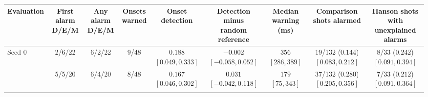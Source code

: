 \begin{table}[t]
\centering
\small
\setlength{\tabcolsep}{2pt}
\begin{tabular}{@{}lcccccccc@{}}
\toprule
Evaluation & \shortstack{First alarm\\D/E/M} & \shortstack{Any alarm\\D/E/M} & \shortstack{Onsets\\warned} & \shortstack{Onset\\detection} & \shortstack{Detection minus\\random\\reference} & \shortstack{Median warning\\(ms)} & \shortstack{Comparison\\shots alarmed} & \shortstack{Hanson shots\\with unexplained\\alarms} \\
\midrule
\shortstack[l]{Seed 0\\\phantom{{\scriptsize $[\,]$}}} & \shortstack{2/6/22\\\phantom{{\scriptsize $[\,]$}}} & \shortstack{6/2/22\\\phantom{{\scriptsize $[\,]$}}} & \shortstack{9/48\\\phantom{{\scriptsize $[\,]$}}} & \shortstack{$0.188$\\{\scriptsize $[0.049, 0.333]$}} & \shortstack{$-0.002$\\{\scriptsize $[-0.058, 0.052]$}} & \shortstack{$356$\\{\scriptsize $[286, 389]$}} & \shortstack{19/132 ($0.144$)\\{\scriptsize $[0.083, 0.212]$}} & \shortstack{8/33 ($0.242$)\\{\scriptsize $[0.091, 0.394]$}} \\ \addlinespace[4pt]
\shortstack[l]{Seed 1\\\phantom{{\scriptsize $[\,]$}}} & \shortstack{5/5/20\\\phantom{{\scriptsize $[\,]$}}} & \shortstack{6/4/20\\\phantom{{\scriptsize $[\,]$}}} & \shortstack{8/48\\\phantom{{\scriptsize $[\,]$}}} & \shortstack{$0.167$\\{\scriptsize $[0.046, 0.302]$}} & \shortstack{$0.031$\\{\scriptsize $[-0.042, 0.118]$}} & \shortstack{$179$\\{\scriptsize $[75, 343]$}} & \shortstack{37/132 ($0.280$)\\{\scriptsize $[0.205, 0.356]$}} & \shortstack{7/33 ($0.212$)\\{\scriptsize $[0.091, 0.364]$}} \\ \addlinespace[4pt]

\end{tabular}
\end{table}
